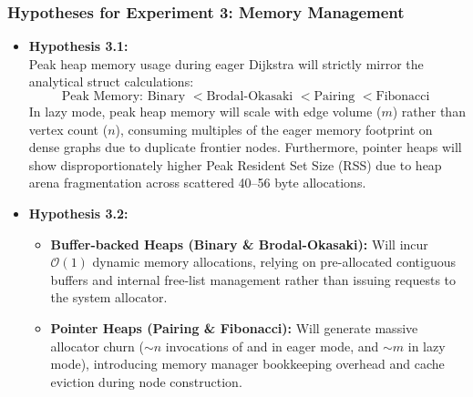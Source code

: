 \subsubsection{Hypotheses for Experiment 3: Memory Management}
\begin{itemize}
  \item \textbf{Hypothesis 3.1:} \\
  Peak heap memory usage during eager Dijkstra will strictly mirror the analytical struct calculations:
  \[
    \text{Peak Memory: } \text{Binary } < \text{Brodal-Okasaki } < \text{Pairing } < \text{Fibonacci }
  \]
  In lazy mode, peak heap memory will scale with edge volume ($m$) rather than vertex count ($n$), consuming multiples of the eager memory footprint on dense graphs due to duplicate frontier nodes. Furthermore, pointer heaps will show disproportionately higher Peak Resident Set Size (RSS) due to heap arena fragmentation across scattered 40--56 byte allocations.
  \item \textbf{Hypothesis 3.2:}
  \begin{itemize}
    \item \textbf{Buffer-backed Heaps (Binary \& Brodal-Okasaki):} Will incur $\mathcal{O}(1)$ dynamic memory allocations, relying on pre-allocated contiguous buffers and internal free-list management rather than issuing requests to the system allocator.
    \item \textbf{Pointer Heaps (Pairing \& Fibonacci):} Will generate massive allocator churn ($\sim n$ invocations of  and  in eager mode, and $\sim m$ in lazy mode), introducing memory manager bookkeeping overhead and cache eviction during node construction.
  \end{itemize}
\end{itemize}